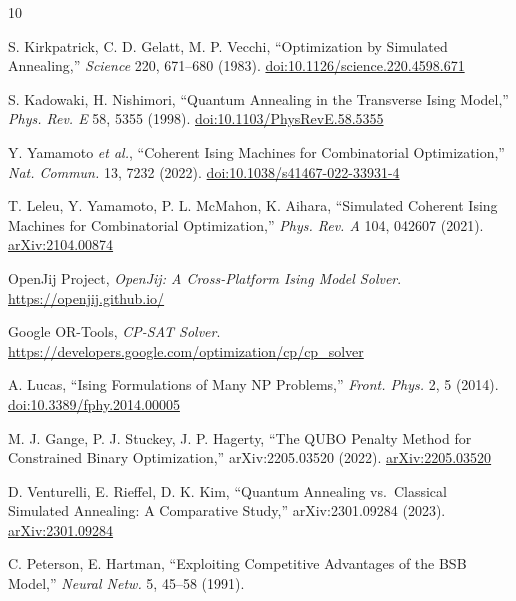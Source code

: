 \documentclass[10pt,twocolumn]{article}
\begin{document}
\begin{thebibliography}{10}

 S. Kirkpatrick, C. D. Gelatt, M. P. Vecchi, ``Optimization by Simulated Annealing,'' \emph{Science} 220, 671--680 (1983). \href{https://doi.org/10.1126/science.220.4598.671}{doi:10.1126/science.220.4598.671}

 S. Kadowaki, H. Nishimori, ``Quantum Annealing in the Transverse Ising Model,'' \emph{Phys. Rev. E} 58, 5355 (1998). \href{https://doi.org/10.1103/PhysRevE.58.5355}{doi:10.1103/PhysRevE.58.5355}

 Y. Yamamoto \emph{et al.}, ``Coherent Ising Machines for Combinatorial Optimization,'' \emph{Nat. Commun.} 13, 7232 (2022). \href{https://doi.org/10.1038/s41467-022-33931-4}{doi:10.1038/s41467-022-33931-4}

 T. Leleu, Y. Yamamoto, P. L. McMahon, K. Aihara, ``Simulated Coherent Ising Machines for Combinatorial Optimization,'' \emph{Phys. Rev. A} 104, 042607 (2021). \href{https://arxiv.org/abs/2104.00874}{arXiv:2104.00874}

 OpenJij Project, \emph{OpenJij: A Cross-Platform Ising Model Solver}. \url{https://openjij.github.io/}

 Google OR-Tools, \emph{CP-SAT Solver}. \url{https://developers.google.com/optimization/cp/cp_solver}

 A. Lucas, ``Ising Formulations of Many NP Problems,'' \emph{Front. Phys.} 2, 5 (2014). \href{https://doi.org/10.3389/fphy.2014.00005}{doi:10.3389/fphy.2014.00005}

 M. J. Gange, P. J. Stuckey, J. P. Hagerty, ``The QUBO Penalty Method for Constrained Binary Optimization,'' arXiv:2205.03520 (2022). \href{https://arxiv.org/abs/2205.03520}{arXiv:2205.03520}

 D. Venturelli, E. Rieffel, D. K. Kim, ``Quantum Annealing vs.\ Classical Simulated Annealing: A Comparative Study,'' arXiv:2301.09284 (2023). \href{https://arxiv.org/abs/2301.09284}{arXiv:2301.09284}

 C. Peterson, E. Hartman, ``Exploiting Competitive Advantages of the BSB Model,'' \emph{Neural Netw.} 5, 45--58 (1991).

\end{thebibliography}
\end{document}
